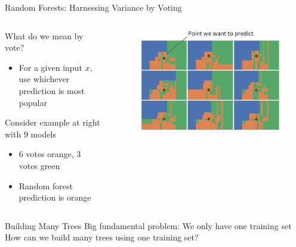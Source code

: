 \documentclass[aspectratio=169]{../latex_main/tntbeamer}  %
\begin{document}
	
	\begin{frame}[c]{Random Forests: Harnessing Variance by Voting}
	    \begin{columns}
	        \begin{column}{.5\textwidth}
	                What do we mean by vote?
	                \begin{itemize}
	                    \item For a given input $x$, use whichever prediction is most popular
	                \end{itemize}
	                
	                Consider example at right with 9 models
	                \begin{itemize}
	                    \item 6 votes orange, 3 votes green 
	                    \item Random forest prediction is orange
	                \end{itemize}
	        \end{column}
	        
	        \begin{column}{.5\textwidth}
	                \begin{figure}
	                    \centering
	                    \includegraphics[scale=.35]{Bild56}
	                \end{figure}
	        \end{column}
	    \end{columns}
	\end{frame}
	
	\begin{frame}[c]{Building Many Trees}
	    Big fundamental problem: We only have one training set\\
	    \bigskip
	    How can we build many trees using one training set?

	\end{frame}
	
\end{document}
